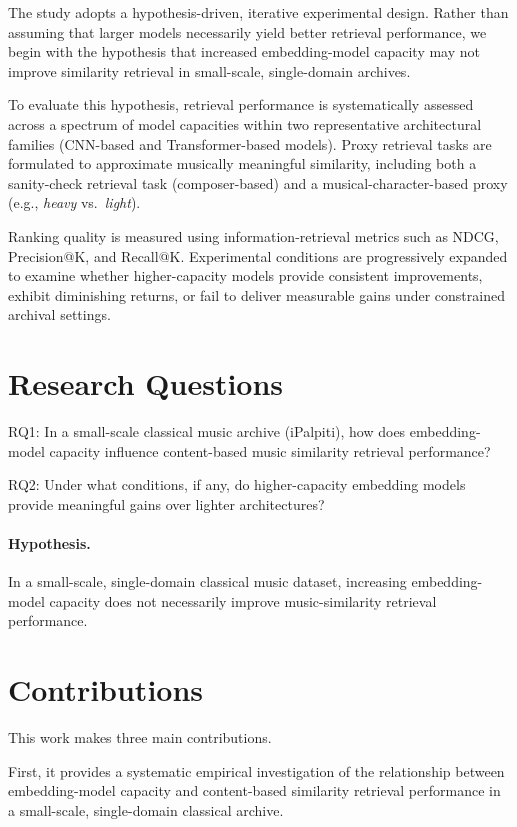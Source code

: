 The study adopts a hypothesis-driven, iterative experimental design. 
Rather than assuming that larger models necessarily yield better retrieval performance, 
we begin with the hypothesis that increased embedding-model capacity may not improve similarity retrieval in small-scale, single-domain archives.

To evaluate this hypothesis, retrieval performance is systematically assessed across a spectrum of model capacities within two representative architectural families (CNN-based and Transformer-based models).
Proxy retrieval tasks are formulated to approximate musically meaningful similarity, including both a sanity-check retrieval task (composer-based) and a musical-character-based proxy (e.g., \emph{heavy} vs.\ \emph{light}).

Ranking quality is measured using information-retrieval metrics such as NDCG, Precision@K, and Recall@K. 
Experimental conditions are progressively expanded to examine whether higher-capacity models provide consistent improvements, exhibit diminishing returns, or fail to deliver measurable gains under constrained archival settings.

\section{Research Questions}

RQ1: In a small-scale classical music archive (iPalpiti), how does embedding-model capacity influence content-based music similarity retrieval performance?

RQ2: Under what conditions, if any, do higher-capacity embedding models provide meaningful gains over lighter architectures?


\paragraph{Hypothesis.}
In a small-scale, single-domain classical music dataset, increasing embedding-model capacity does not necessarily improve music-similarity retrieval performance.


\section{Contributions}

This work makes three main contributions.

First, it provides a systematic empirical investigation of the relationship between embedding-model capacity and content-based similarity retrieval performance in a small-scale, single-domain classical archive.

